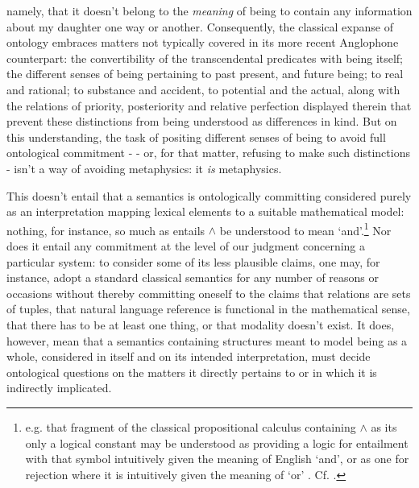 \documentclass[]{article}
\begin{document}
namely, 
that it doesn't belong to the \emph{meaning} of being to contain any information about my daughter one way or another. 
Consequently, the classical expanse of ontology embraces matters not typically covered in its more recent Anglophone counterpart: 
the convertibility of the transcendental predicates with being itself;  
the different senses of being pertaining 
to past present, and future being;
to real and rational;
to substance and accident, 
to potential and the actual, 
along with the relations of priority, posteriority and relative perfection displayed therein
that prevent these distinctions from being understood as differences in kind. 
But on this understanding, the task of positing different senses of being to avoid full ontological commitment - 
- or, for that matter, refusing to make such distinctions - 
isn't a way of avoiding metaphysics: it \emph{is} metaphysics.

This doesn't entail that a semantics is ontologically committing considered purely as an interpretation mapping lexical elements to a suitable mathematical model: 
nothing, for instance, so much as entails $\wedge$ be understood to mean `and'.\footnote{
	e.g. that fragment of the classical propositional calculus containing $\wedge$ as its only a logical constant may be understood as providing a logic for entailment with that symbol intuitively given the meaning of English `and', 
	or as one for rejection where it is intuitively given the meaning of `or' . Cf. \autocite[222]{Kripke2015}.}
Nor does it entail any commitment at the level of our judgment concerning a particular system: 
to consider some of its less plausible claims, 
one may, for instance, adopt a standard classical semantics for any number of reasons or occasions without thereby committing oneself to the claims 
that relations are sets of tuples, 
that natural language reference is functional in the mathematical sense, 
that there has to be at least one thing, 
or that modality doesn't exist.
It does, however, mean
that a semantics containing structures meant to model being as a whole, 
considered in itself and on its intended interpretation, 
must decide ontological questions on the matters it directly pertains to or in which it is indirectly implicated. 
\end{document}

